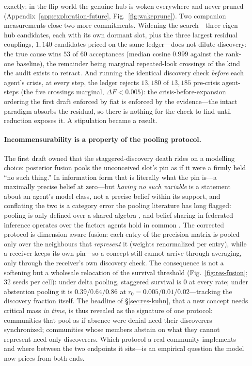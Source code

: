\documentclass[11pt]{article}
\begin{document}
exactly; in the flip world the genuine hub is woken everywhere and never pruned
(Appendix~\ref{app:exploration-future}, Fig.~\ref{fig:wakeprune}). Two companion measurements
close two more commitments. Widening the search---three eigen-hub candidates, each with its own
dormant slot, plus the three largest residual couplings, $1{,}140$ candidates priced on the same
ledger---does not dilute discovery: the true cause wins $53$ of $60$ acceptances (median cosine
$0.999$ against the rank-one baseline), the remainder being marginal repeated-look crossings of
the kind the audit exists to retract. And running the identical discovery check \emph{before}
each agent's crisis, at every step, the ledger rejects $13{,}180$ of $13{,}185$ pre-crisis
agent-steps (the five crossings marginal, $\Delta F<0.005$): the crisis-before-expansion ordering
the first draft enforced by fiat is enforced by the evidence---the intact paradigm absorbs the
residual, so there is nothing for the check to find until reduction exposes it. A stipulation
became a result.

\paragraph{Incommensurability is a property of the pooling protocol.}
The first draft owned that the staggered-discovery death rides on a modelling choice: posterior
fusion pools the unconceived slot's pin as if it were a firmly held ``no such thing.'' In
information form that is literally what the pin is---a maximally precise belief at zero---but
\emph{having no such variable} is a statement about an agent's model class, not a precise belief
within its support, and conflating the two is a category error the pooling literature has long
flagged: pooling is only defined over a shared algebra \citep{genest1986}, and belief sharing in
federated inference operates over the factors agents hold in common
\citep{friston2023federated}. The corrected protocol is dimension-aware fusion: each entry of the
precision matrix is pooled only over the neighbours that \emph{represent} it (weights
renormalized per entry), while a receiver keeps its own pin---so a concept still cannot arrive
through averaging, only through the receiver's own discovery check. The consequence is not a
softening but a wholesale relocation of the survival threshold (Fig.~\ref{fig:res-fusion}; 32
seeds per cell): under delta pooling, staggered survival is $0$ at every rate; under abstention
pooling it is $0.39/0.64/0.86$ at $r_0=0.005/0.01/0.02$---tracking the discovery fraction itself.
The headline of \S\ref{sec:res-kuhn}, that a new concept needs critical mass \emph{in time}, is
thus revealed as the signature of one protocol: communities that pool as if absence were denial
need their discoverers synchronized; communities whose members abstain on what they cannot
represent need only discoverers. Which protocol a real community implements---and where between
the two endpoints it sits---is an empirical question the model now prices from both ends.
\end{document}
